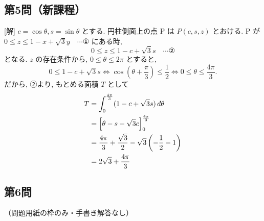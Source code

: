 \documentclass[../main.tex]{subfiles}
\begin{document}
\newpage


\subsection*{第5問（新課程）}

[解] $c = \cos\theta, s = \sin\theta$ とする. 円柱側面上の点 P は $P(c, s, z)$ とおける. P が $0 \le z \le 1 - x + \sqrt{3}y \quad \cdots \text{①}$ にある時,
\[
  0 \le z \le 1 - c + \sqrt{3}s \quad \cdots \text{②}
\]
となる. $z$ の存在条件から, $0 \le \theta \le 2\pi$ とすると,
\[
  0 \le 1 - c + \sqrt{3}s \iff \cos\left(\theta + \frac{\pi}{3}\right) \le \frac{1}{2} \iff 0 \le \theta \le \frac{4\pi}{3}.
\]
だから, ②より, もとめる面積 $T$ として
\begin{align*}
  T &= \int_0^{\frac{4\pi}{3}} (1 - c + \sqrt{3}s) \, d\theta \\
  &= \Bigl[ \theta - s - \sqrt{3}c \Bigr]_0^{\frac{4\pi}{3}} \\
  &= \frac{4\pi}{3} + \frac{\sqrt{3}}{2} - \sqrt{3}\left(-\frac{1}{2} - 1\right) \\
  &= 2\sqrt{3} + \frac{4\pi}{3}
\end{align*}

\newpage

\subsection*{第6問}

（問題用紙の枠のみ・手書き解答なし）

\newpage

\end{document}
